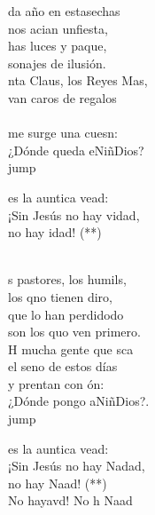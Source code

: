 \begin{cancion}%
	da año en estasechas\\
	nos acian unfiesta,\\
	has luces y paque,\\
	sonajes de ilusión.\\
	nta Claus, los Reyes Mas,\\
	van caros de regalos\\
	\jump\\
	me surge una cuesn: \\
	¿Dónde queda eNiñDios? \\jump\\
	\begin{chorus}%
	es la auntica vead:\\
	¡Sin Jesús no hay vidad, \\
	no hay idad! (**)\\
	\end{chorus}%
	\jump\\
	s pastores, los humils,\\
	los qno tienen diro,\\
	 que lo han perdidodo\\
	son los quo ven primero.\\
	H mucha gente que sca\\
	el seno de estos días\\
	y prentan con ón:\\
	¿Dónde pongo aNiñDios?. \\jump\\
	\begin{chorus}%
	es la auntica vead:\\
	¡Sin Jesús no hay Nadad, \\
	no hay Naad! (**)\\
	No hayavd! No h Naad\\
	\end{chorus}%
	\jump\\
\end{cancion}%
